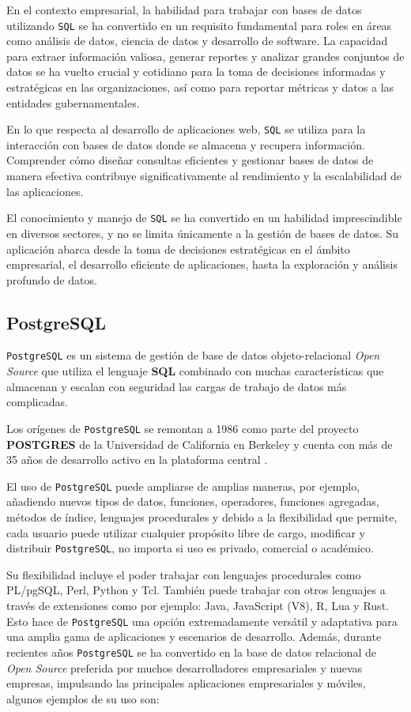 En el contexto empresarial, la habilidad para trabajar con bases de datos utilizando \texttt{SQL} se ha convertido en un requisito fundamental para roles en áreas como análisis de datos, ciencia de datos y desarrollo de software. La capacidad para extraer información valiosa, generar reportes y analizar grandes conjuntos de datos se ha vuelto crucial y cotidiano para la toma de decisiones informadas y estratégicas en las organizaciones, así como para reportar métricas y datos a las entidades gubernamentales.

En lo que respecta al desarrollo de aplicaciones web, \texttt{SQL} se utiliza para la interacción con bases de datos donde se almacena y recupera información. Comprender cómo diseñar consultas eficientes y gestionar bases de datos de manera efectiva contribuye significativamente al rendimiento y la escalabilidad de las aplicaciones.

El conocimiento y manejo de \texttt{SQL} se ha convertido en un habilidad imprescindible en diversos sectores, y no se limita únicamente a la gestión de bases de datos. Su aplicación abarca desde la toma de decisiones estratégicas en el ámbito empresarial, el desarrollo eficiente de aplicaciones, hasta la exploración y análisis profundo de datos.

\subsection{PostgreSQL}

\texttt{PostgreSQL} es un sistema de gestión de base de datos objeto-relacional \textit{Open Source} que utiliza el lenguaje \textbf{SQL} combinado con muchas características que almacenan y escalan con seguridad las cargas de trabajo de datos más complicadas. 

Los orígenes de \texttt{PostgreSQL} se remontan a 1986 como parte del proyecto \textbf{POSTGRES} de la Universidad de California en Berkeley y cuenta con más de 35 años de desarrollo activo en la plataforma central \cite{postgresql_about}.

El uso de \texttt{PostgreSQL} puede ampliarse de amplias maneras, por ejemplo, añadiendo nuevos tipos de datos, funciones, operadores, funciones agregadas, métodos de índice, lenguajes procedurales y debido a la flexibilidad que permite, cada usuario puede utilizar cualquier propósito libre de cargo, modificar y distribuir \texttt{PostgreSQL}, no importa si uso es privado, comercial o académico.

Su flexibilidad incluye el poder trabajar con lenguajes procedurales como PL/pgSQL, Perl, Python y Tcl. También puede trabajar con otros lenguajes a través de extensiones como por ejemplo: Java, JavaScript (V8), R, Lua y Rust. Esto hace de \texttt{PostgreSQL} una opción extremadamente versátil y adaptativa para una amplia gama de aplicaciones y escenarios de desarrollo. Además, durante recientes años \texttt{PostgreSQL} se ha convertido en la base de datos relacional de \textit{Open Source} preferida por muchos desarrolladores empresariales y nuevas empresas, impulsando las principales aplicaciones empresariales y móviles, algunos ejemplos de su uso son:

